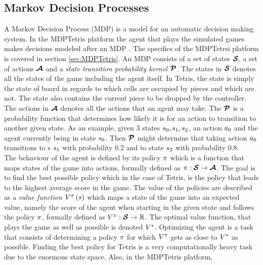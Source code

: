 \subsection{Markov Decision Processes \label{MDP}}

A Markov Decision Process (MDP) is a model for an automatic 
decision making system. In the MDPTetris platform the agent
that plays the simulated games makes decisions modeled
after an MDP \citep{mdptetris}. The specifics of the 
MDPTetrsi platform is covered in section \ref{sec:MDPTetris}.
An MDP consists of a set of states $\boldsymbol{\mathcal{S}}$,
a set of actions $\boldsymbol{\mathcal{A}}$ and a 
\textit{state transition probability kernel} $\boldsymbol{\mathcal{P}}$.
The states in $\boldsymbol{\mathcal{S}}$ denotes all the states of the game
including the agent itself. In Tetris, the state is simply the
state of board in regards to which cells are
occupied by pieces and which are not. The state also contains
the current piece to be dropped by the controller.
The actions in $\boldsymbol{\mathcal{A}}$
denotes all the actions that an agent may take. The $\boldsymbol{\mathcal{P}}$ is
a probability function that determines how likely it is for an action 
to transition to another given state. As an example, given 3 states 
$s_0, s_1, s_2$, an action $a_0$ and the 
agent currently being in state $s_0$. Then $\boldsymbol{\mathcal{P}}$
might determine that taking action $a_0$ transitions
to s $s_1$ with probability 0.2 and to state $s_2$
with probability 0.8. \\
The behaviour of the agent is defined by its policy $\pi$
which is a function that maps states of the game into actions, formally
defined as $\pi : \boldsymbol{\mathcal{S}} \rightarrow \boldsymbol{\mathcal{A}}$.
The goal is to find the best possible policy which in the case
of Tetris, is the policy that leads to the highest average score
in the game. The value of the policies are described as a 
\textit{value function} 
$V^{\pi}\left( s  \right)$ 
which maps a state
of the game into an expected value, namely the score of the 
agent when starting in the given state and follows
the policy $\pi$, formally defined as
$V^{\pi} : \boldsymbol{\mathcal{S}} \rightarrow \mathbb{R}$. 
The optimal value function, that plays the game as well
as possible is denoted $V^{*}$. Optimizing the 
agent is a task that consists of determining a policy $\pi$ for which
$V^{\pi}$ gets as close to $V^{*}$
as possible. Finding the best policy for Tetris is a very computationally heavy 
task due to the enormous state space. Also, in the MDPTetris platform,
